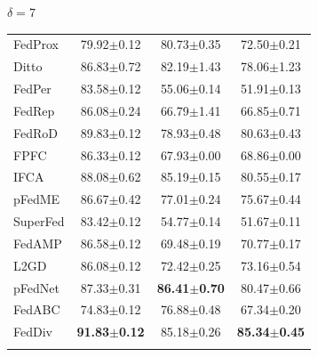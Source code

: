 \documentclass[journal]{IEEEtran}
\begin{document}
\begin{table}
\begin{subtable}[]{$\delta=7$}
\begin{tabular}{lccc}
			FedProx  & 79.92$\pm$0.12          & 80.73$\pm$0.35          & 72.50$\pm$0.21          \\
			Ditto    & 86.83$\pm$0.72          & 82.19$\pm$1.43          & 78.06$\pm$1.23          \\
			FedPer   & 83.58$\pm$0.12          & 55.06$\pm$0.14          & 51.91$\pm$0.13          \\
			FedRep   & 86.08$\pm$0.24          & 66.79$\pm$1.41          & 66.85$\pm$0.71          \\
			FedRoD   & 89.83$\pm$0.12          & 78.93$\pm$0.48          & 80.63$\pm$0.43          \\
			FPFC     & 86.33$\pm$0.12          & 67.93$\pm$0.00          & 68.86$\pm$0.00          \\
			IFCA     & 88.08$\pm$0.62          & 85.19$\pm$0.15          & 80.55$\pm$0.17          \\
			pFedME   & 86.67$\pm$0.42          & 77.01$\pm$0.24          & 75.67$\pm$0.44          \\
			SuperFed & 83.42$\pm$0.12          & 54.77$\pm$0.14          & 51.67$\pm$0.11          \\
			FedAMP   & 86.58$\pm$0.12          & 69.48$\pm$0.19          & 70.77$\pm$0.17          \\
			L2GD   & 86.08$\pm$0.12          & 72.42$\pm$0.25          & 73.16$\pm$0.54          \\
			pFedNet  & 87.33$\pm$0.31          & \textbf{86.41$\pm$0.70} & 80.47$\pm$0.66          \\
			FedABC   & 74.83$\pm$0.12          & 76.88$\pm$0.48          & 67.34$\pm$0.20          \\ %
			FedDiv   & \textbf{91.83$\pm$0.12} & 85.18$\pm$0.26          & \textbf{85.34$\pm$0.45} \\ \bottomrule 
			\specialrule{0em}{3pt}{1pt} 
		\end{tabular}
	\end{subtable}
\end{table}
\end{document}
